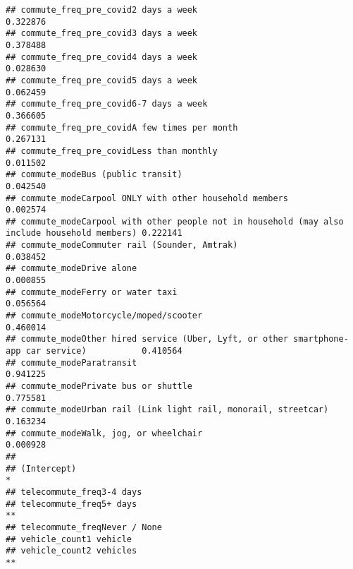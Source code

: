 \documentclass[
]{article}
\begin{document}
\begin{verbatim}
## commute_freq_pre_covid2 days a week                                                         0.322876
## commute_freq_pre_covid3 days a week                                                         0.378488
## commute_freq_pre_covid4 days a week                                                         0.028630
## commute_freq_pre_covid5 days a week                                                         0.062459
## commute_freq_pre_covid6-7 days a week                                                       0.366605
## commute_freq_pre_covidA few times per month                                                 0.267131
## commute_freq_pre_covidLess than monthly                                                     0.011502
## commute_modeBus (public transit)                                                            0.042540
## commute_modeCarpool ONLY with other household members                                       0.002574
## commute_modeCarpool with other people not in household (may also include household members) 0.222141
## commute_modeCommuter rail (Sounder, Amtrak)                                                 0.038452
## commute_modeDrive alone                                                                     0.000855
## commute_modeFerry or water taxi                                                             0.056564
## commute_modeMotorcycle/moped/scooter                                                        0.460014
## commute_modeOther hired service (Uber, Lyft, or other smartphone-app car service)           0.410564
## commute_modeParatransit                                                                     0.941225
## commute_modePrivate bus or shuttle                                                          0.775581
## commute_modeUrban rail (Link light rail, monorail, streetcar)                               0.163234
## commute_modeWalk, jog, or wheelchair                                                        0.000928
##                                                                                                
## (Intercept)                                                                                 *  
## telecommute_freq3-4 days                                                                       
## telecommute_freq5+ days                                                                     ** 
## telecommute_freqNever / None                                                                   
## vehicle_count1 vehicle                                                                         
## vehicle_count2 vehicles                                                                     ** 

\end{verbatim}
\end{document}
